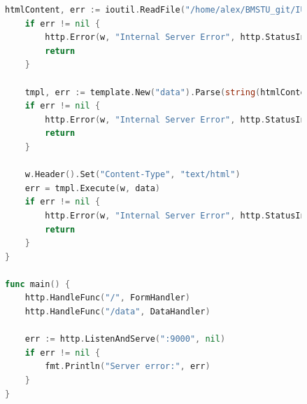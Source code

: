 \documentclass[a4paper, 14pt]{extarticle}
\begin{document}
\newpage

\begin{figure}[!htb]
\begin{lstlisting}[language={Go},caption={o.1.go - продолжение},label={lst:code2}]
	htmlContent, err := ioutil.ReadFile("/home/alex/BMSTU_git/IU9-CN-GO/lab1/0.1/data.html")
	if err != nil {
		http.Error(w, "Internal Server Error", http.StatusInternalServerError)
		return
	}

	tmpl, err := template.New("data").Parse(string(htmlContent))
	if err != nil {
		http.Error(w, "Internal Server Error", http.StatusInternalServerError)
		return
	}

	w.Header().Set("Content-Type", "text/html")
	err = tmpl.Execute(w, data)
	if err != nil {
		http.Error(w, "Internal Server Error", http.StatusInternalServerError)
		return
	}
}

func main() {
	http.HandleFunc("/", FormHandler)
	http.HandleFunc("/data", DataHandler)

	err := http.ListenAndServe(":9000", nil)
	if err != nil {
		fmt.Println("Server error:", err)
	}
}
\end{lstlisting}
\end{figure}
\end{document}
